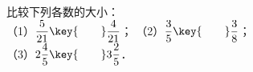比较下列各数的大小：\\
（1）$\dfrac {5}{21}\key{\qquad}\dfrac {4}{21}$；\qquad\qquad\qquad\qquad
（2）$\dfrac {3}{5}\key{\qquad}\dfrac {3}{8}$；\\
（3）$2\dfrac {4}{5}\key{\qquad}3\dfrac {2}{5}$．